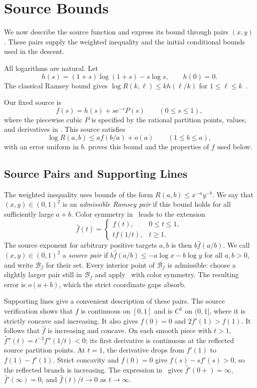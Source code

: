 \documentclass[11pt]{article}
\theoremstyle{definition}
\newcommand{\e}{\mathrm e}
\newcommand{\BB}{\mathcal B}
\begin{document}
\section{Source Bounds}\label{sec:inputs}
We now describe the source function and express its bound through pairs $(x,y)$.
These pairs supply the weighted inequality and the initial conditional bounds used in the descent.

All logarithms are natural. Let
\[
 h(s)=(1+s)\log(1+s)-s\log s,\qquad h(0)=0.
\]
The classical Ramsey bound gives $\log R(k,\ell)\le kh(\ell/k)$ for $1\le\ell\le k$~\cite{ES}.

Our fixed source is
\begin{equation}\label{eq:source-f}
 f(s)=h(s)+s\e^{-s}P(s)\qquad(0\le s\le1),
\end{equation}
where the piecewise cubic $P$ is specified by the rational partition points, values, and derivatives in .
This source satisfies
\begin{equation}\label{eq:source-rate}
 \log R(a,b)\le a f(b/a)+o(a)\qquad(1\le b\le a),
\end{equation}
with an error uniform in $b$.
 proves this bound and the properties of $f$ used below.

\subsection{Source Pairs and Supporting Lines}
The weighted inequality uses bounds of the form $R(a,b)\le x^{-a}y^{-b}$.
We say that $(x,y)\in(0,1)^2$ is an \emph{admissible Ramsey pair} if this bound holds for all sufficiently large $a+b$.
Color symmetry in~ leads to the extension
\[
 \widehat f(t)=
 \begin{cases}f(t),&0\le t\le1,\\ t f(1/t),&t\ge1.\end{cases}
\]
The source exponent for arbitrary positive targets $a,b$ is then $b\widehat f(a/b)$.
We call $(x,y)\in(0,1)^2$ a \emph{source pair} if
$b\widehat f(a/b)\le-a\log x-b\log y$ for all $a,b>0$, and write $\BB_f$ for their set.
Every interior point of $\BB_f$ is admissible: choose a slightly larger pair still in $\BB_f$ and apply~ with color symmetry.
The resulting error is $o(a+b)$, which the strict coordinate gaps absorb.

Supporting lines give a convenient description of these pairs.
The source verification shows that $f$ is continuous on $[0,1]$ and is $C^1$ on $(0,1]$, where it is strictly concave and increasing.
It also gives $f(0)=0$ and $2f'(1)>f(1)$.
It follows that $\widehat f$ is increasing and concave.
On each smooth piece with $t>1$, $\widehat f''(t)=t^{-3}f''(1/t)<0$; its first derivative is continuous at the reflected source partition points. At $t=1$, the derivative drops from $f'(1)$ to $f(1)-f'(1)$.
Strict concavity and $f(0)=0$ give $f(s)-sf'(s)>0$, so the reflected branch is increasing.
The expression in~ gives $\widehat f'(0+)=\infty$, $\widehat f'(\infty)=0$, and $\widehat f(t)/t\to0$ as $t\to\infty$.
\end{document}
